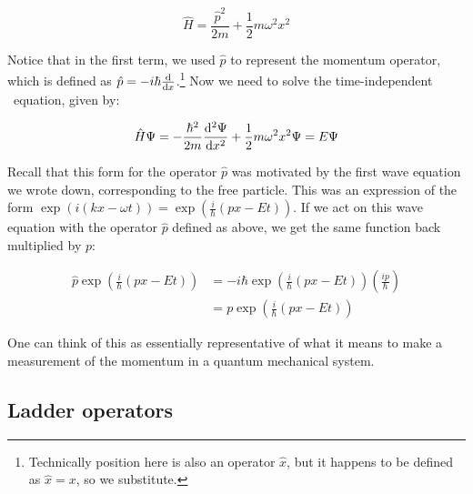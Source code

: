 \begin{tcolorbox}[title = Hamiltonian for the QHO] \vspace{-2ex}
	\begin{equation}
	\hat{H} = \frac{\hat{p}^2}{2m} + \frac{1}{2}m\omega^2x^2 \label{eq:ham-qho}
	\end{equation}
\end{tcolorbox}

Notice that in the first term, we used $\hat{p}$ to represent the momentum operator, which is defined as $\hat{p} = -i\hbar\dv{x}$.\footnote{Technically position here is also an operator $\hat{x}$, but it happens to be defined as $\hat{x} = x$, so we substitute.} 
Now we need to solve the time-independent \Sch\ equation, given by:

\begin{tcolorbox}[title = \Sch\ equation for the QHO] \vspace{-2ex}
	\begin{equation}
		\hat{H}\Psi = -\frac{\hbar^2}{2m}\dv[2]{\Psi}{x} + \frac{1}{2}m\omega^2x^2\Psi = E\Psi \label{eq:se-qho}
	\end{equation}
\end{tcolorbox}

Recall that this form for the operator $\hat{p}$ was motivated by the first wave equation we wrote down, corresponding to the free particle. 
This was an expression of the form $\exp\left(i(kx-\omega t)\right) = \exp \left( \frac{i}{\hbar}(px-Et) \right)$. 
If we act on this wave equation with the operator $\hat{p}$ defined as above, we get the same function back multiplied by $p$:

\begin{align*}
	\hat{p}\exp \left(\frac{i}{\hbar}(px-Et)\right) &= -i\hbar\exp \left(\frac{i}{\hbar}(px-Et)\right) \left(\frac{ip}{\hbar}\right) \\
	&= p\exp \left(\frac{i}{\hbar}(px-Et)\right)
\end{align*}

One can think of this as essentially representative of what it means to make a measurement of the momentum in a quantum mechanical system.



\subsection{Ladder operators}


